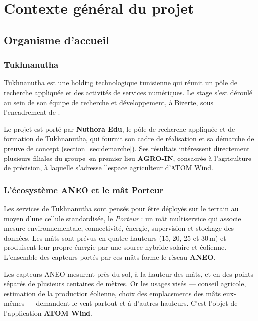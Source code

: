 \chapter{Contexte général du projet}
\label{chap:contexte}

\section{Organisme d'accueil}

\subsection{Tukhnanutha}
Tukhnanutha est une holding technologique tunisienne qui réunit un pôle de recherche appliquée et
des activités de services numériques. Le stage s'est déroulé au sein de son équipe de recherche et
développement, à Bizerte, sous l'encadrement de .

Le projet est porté par \textbf{Nuthora Edu}, le pôle de recherche appliquée et de formation de
Tukhnanutha, qui fournit son cadre de réalisation et sa démarche de preuve de concept
(section~\ref{sec:demarche}). Ses résultats intéressent directement plusieurs filiales du groupe,
en premier lieu \textbf{AGRO-IN}, consacrée à l'agriculture de précision, à laquelle s'adresse
l'espace agriculteur d'ATOM Wind.

\subsection{L'écosystème ANEO et le mât Porteur}
Les services de Tukhnanutha sont pensés pour être déployés sur le terrain au moyen d'une cellule
standardisée, le \emph{Porteur} : un mât multiservice qui associe mesure environnementale,
connectivité, énergie, supervision et stockage des données. Les mâts sont prévus en quatre
hauteurs (15, 20, 25 et 30\,m) et produisent leur propre énergie par une source hybride solaire et
éolienne. L'ensemble des capteurs portés par ces mâts forme le réseau \textbf{ANEO}.

Les capteurs ANEO mesurent près du sol, à la hauteur des mâts, et en des points séparés de
plusieurs centaines de mètres. Or les usages visés --- conseil agricole, estimation de la
production éolienne, choix des emplacements des mâts eux-mêmes --- demandent le vent partout et à
d'autres hauteurs. C'est l'objet de l'application \textbf{ATOM Wind}.

